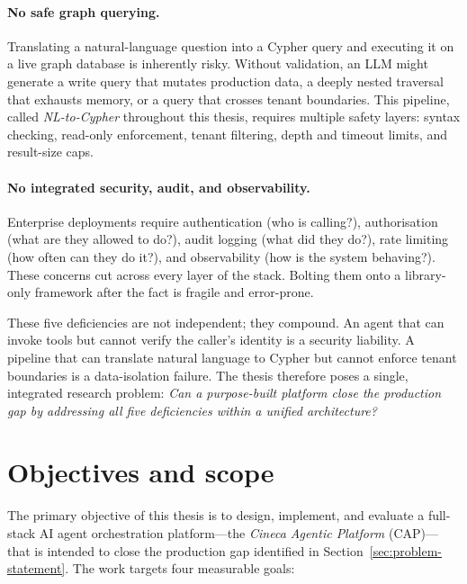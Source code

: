 \documentclass[a4paper]{sapthesis}
\begin{document}
\paragraph{No safe graph querying.}
Translating a natural-language question into a Cypher query and executing it
on a live graph database is inherently risky.  Without validation, an LLM
might generate a write query that mutates production data, a deeply nested
traversal that exhausts memory, or a query that crosses tenant boundaries.
This pipeline, called \emph{NL-to-Cypher} throughout this thesis, requires
multiple safety layers: syntax checking, read-only enforcement, tenant
filtering, depth and timeout limits, and result-size caps.

\paragraph{No integrated security, audit, and observability.}
Enterprise deployments require authentication (who is calling?),
authorisation (what are they allowed to do?), audit logging (what did they
do?), rate limiting (how often can they do it?), and observability (how is
the system behaving?).  These concerns cut across every layer of the stack.
Bolting them onto a library-only framework after the fact is fragile and
error-prone.

These five deficiencies are not independent; they compound.  An agent that
can invoke tools but cannot verify the caller's identity is a security
liability.  A pipeline that can translate natural language to Cypher but
cannot enforce tenant boundaries is a data-isolation failure.  The
thesis therefore poses a single, integrated research problem:
\emph{Can a purpose-built platform close the production gap by addressing
all five deficiencies within a unified architecture?}

\section{Objectives and scope}
\label{sec:objectives-scope}

The primary objective of this thesis is to design, implement, and evaluate a
full-stack AI agent orchestration platform---the \emph{Cineca Agentic
Platform} (CAP)---that is intended to close the production gap identified in
Section~\ref{sec:problem-statement}.  The work targets four measurable goals:
\end{document}
